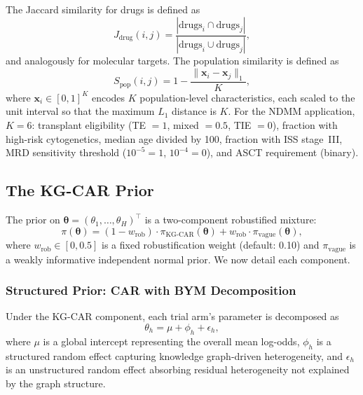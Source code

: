 \documentclass[12pt]{article}
\newcommand{\btheta}{\boldsymbol{\theta}}
\begin{document}
The Jaccard similarity for drugs is defined as
\begin{equation}
\label{eq:jaccard}
J_{\text{drug}}(i,j) = \frac{|\text{drugs}_i \cap \text{drugs}_j|}{|\text{drugs}_i \cup \text{drugs}_j|},
\end{equation}
and analogously for molecular targets. The population similarity is defined as
\begin{equation}
\label{eq:pop_similarity}
S_{\text{pop}}(i,j) = 1 - \frac{\|\mathbf{x}_i - \mathbf{x}_j\|_1}{K},
\end{equation}
where $\mathbf{x}_i \in [0,1]^K$ encodes $K$ population-level characteristics, each scaled to the unit interval so that the maximum $L_1$ distance is $K$. For the NDMM application, $K = 6$: transplant eligibility (TE $= 1$, mixed $= 0.5$, TIE $= 0$), fraction with high-risk cytogenetics, median age divided by 100, fraction with ISS stage~III, MRD sensitivity threshold ($10^{-5} = 1$, $10^{-4} = 0$), and ASCT requirement (binary).

\subsection{The KG-CAR Prior}
\label{sec:kgcar_prior}

The prior on $\btheta = (\theta_1, \ldots, \theta_H)^\top$ is a two-component robustified mixture:
\begin{equation}
\label{eq:mixture}
\pi(\btheta) = (1 - w_{\text{rob}}) \cdot \pi_{\text{KG-CAR}}(\btheta) + w_{\text{rob}} \cdot \pi_{\text{vague}}(\btheta),
\end{equation}
where $w_{\text{rob}} \in [0, 0.5]$ is a fixed robustification weight (default: 0.10) and $\pi_{\text{vague}}$ is a weakly informative independent normal prior. We now detail each component.

\subsubsection{Structured Prior: CAR with BYM Decomposition}

Under the KG-CAR component, each trial arm's parameter is decomposed as
\begin{equation}
\label{eq:bym}
\theta_h = \mu + \phi_h + \epsilon_h,
\end{equation}
where $\mu$ is a global intercept representing the overall mean log-odds, $\phi_h$ is a structured random effect capturing knowledge graph-driven heterogeneity, and $\epsilon_h$ is an unstructured random effect absorbing residual heterogeneity not explained by the graph structure.
\end{document}
